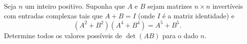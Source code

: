 Seja \(n\) um inteiro positivo. Suponha que \(A\) e \(B\) sejam matrizes \(n \times n\) invertíveis com entradas complexas tais que \(A + B = I\) (onde \(I\) é a matriz identidade) e
\[
(A^2 + B^2)(A^4 + B^4) = A^5 + B^5.
\]
Determine todos os valores possíveis de \(\det(AB)\) para o dado \(n\).
